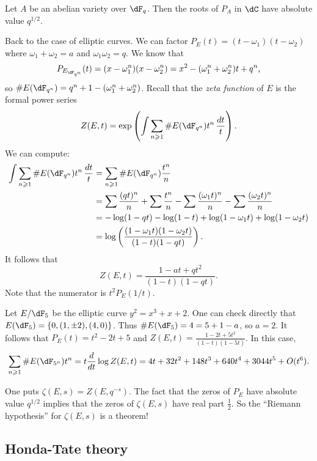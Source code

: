\begin{theorem}[Weil]
Let $A$ be an abelian variety over $\dF_q$. Then the roots of $P_A$ in $\dC$ 
have absolute value $q^{1/2}$. 
\end{theorem}

Back to the case of elliptic curves. We can factor 
$P_E(t)=(t-\omega_1)(t-\omega_2)$ where $\omega_1+\omega_2=a$ and 
$\omega_1 \omega_2 = q$. We know that 
\[
  P_{E_{\dF_{q^n}}}(t) = (x-\omega_1^n)(x-\omega_2^n) 
    = x^2 - (\omega_1^n + \omega_2^n) t + q^n \text{,}
\]
so $\# E(\dF_{q^n}) = q^n+1 - (\omega_1^n+\omega_2^n)$. Recall that the 
\emph{zeta function} of $E$ is the formal power series 
\[
  Z(E,t) = \exp\left(\int \sum_{n\geqslant 1} \# E(\dF_{q^n}) t^n\, \frac{dt}{t}\right) \text{.}
\]
We can compute:
\begin{align*}
  \int \sum_{n\geqslant 1} \# E(\dF_{q^n}) t^n\, \frac{dt}{t}
    &= \sum_{n\geqslant 1} \# E(\dF_{q^n}) \frac{t^n}{n} \\
    &= \sum \frac{(q t)^n}{n} + \sum \frac{t^n}{n} - \sum \frac{(\omega_1 t)^n}{n} - \sum \frac{(\omega_2 t)^n}{n} \\
    &= -\log(1-q t) - \log(1-t) + \log(1-\omega_1 t) + \log(1-\omega_2 t) \\
    &= \log\left(\frac{(1-\omega_1 t)(1-\omega_2 t)}{(1-t)(1-q t)} \right) \text{.}
\end{align*}
It follows that 
\[
  Z(E,t) = \frac{1-a t+q t^2}{(1-t)(1-q t)} \text{.}
\]
Note that the numerator is $t^2 P_E(1/t)$. 

\begin{example}
Let $E/\dF_5$ be the elliptic curve $y^2=x^3+x+2$. One can check directly that 
$E(\dF_5) = \{0,(1,\pm 2), (4,0)\}$. Thus $\# E(\dF_5) = 4=5+1-a$, so $a=2$. 
It follows that $P_E(t) = t^2-2 t+5$ and 
$Z(E,t) =\frac{1-2 t+5 t^2}{(1-t)(1-5 t)}$. In this case, 
\[
  \sum_{n\geqslant 1} \# E(\dF_{5^n}) t^n = t\frac{d}{dt}\log Z(E,t)
    = 4t + 32 t^2 + 148 t^3 + 640 t^4 + 3044 t^5 + O(t^6) \text{.}
\]
\end{example}

One puts $\zeta(E,s) = Z(E,q^{-s})$. The fact that the zeros of 
$P_E$ have absolute value $q^{1/2}$ implies that the zeros of 
$\zeta(E,s)$ have real part $\frac 1 2$. So the ``Riemann hypothesis'' for 
$\zeta(E,s)$ is a theorem!


\subsection{Honda-Tate theory}

